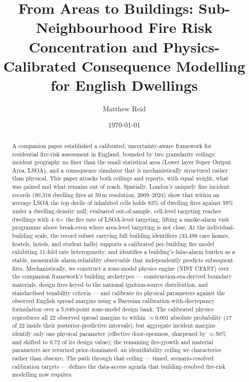 \documentclass[11pt]{article}
\title{From Areas to Buildings: Sub-Neighbourhood Fire Risk Concentration and
Physics-Calibrated Consequence Modelling for English Dwellings}
\author{Matthew Reid}
\date{\today}
\begin{document}
\linenumbers
\maketitle

\begin{abstract}
A companion paper established a calibrated, uncertainty-aware framework for
residential fire-risk assessment in England, bounded by two granularity
ceilings: incident geography no finer than the small statistical area (Lower
layer Super Output Area, LSOA), and a consequence simulator that is
mechanistically structured rather than physical. This paper attacks both ceilings and
reports, with equal weight, what was gained and what remains out of reach.
Spatially, London's uniquely fine incident records (90{,}318 dwelling fires at
50\,m resolution, 2009--2024) show that within an average LSOA the top decile of
inhabited cells holds 83\% of dwelling fires against 59\% under a
dwelling-density null; evaluated out-of-sample, cell-level targeting reaches
dwellings with 4--6$\times$ the fire rate of LSOA-level targeting, lifting a
smoke-alarm visit programme above break-even where area-level targeting is not
close. At the individual-building scale, the record subset carrying full
building identifiers (33{,}498 care homes, hostels, hotels, and student halls) supports
a calibrated per-building fire model exhibiting 11-fold rate heterogeneity, and
identifies a building's false-alarm burden as a stable, measurable
alarm-reliability observable that independently predicts subsequent fires.
Mechanistically, we construct a zone-model physics engine (NIST CFAST) over the
companion framework's building archetypes --- construction-era-derived boundary
materials, design fires keyed to the national ignition-source distribution, and
standardised tenability criteria --- and calibrate its physical parameters
against the observed English spread margins using a Bayesian
calibration-with-discrepancy formulation over a 5{,}040-point zone-model design
bank. The calibrated physics reproduces all 22 observed spread margins to within
$\approx$0.001 absolute probability (17 of 22 inside their posterior-predictive
intervals), but aggregate incident margins identify
only one physical parameter (effective door-openness, sharpened by $\approx$50\% and
shifted to 0.72 of its design value); the remaining fire-growth and material
parameters are returned prior-dominated, an identifiability ceiling we
characterise rather than obscure. The path through that ceiling --- timed,
scenario-resolved calibration targets --- defines the data-access agenda that
building-resolved fire-risk modelling now requires.
\end{abstract}
\end{document}
